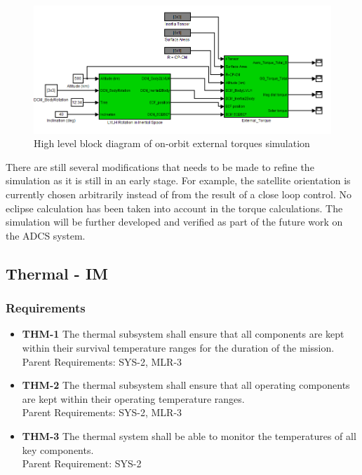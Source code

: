 \documentclass[12pt]{article}
\begin{document}
						
			\begin{figure}[!ht]
				\centering
				\includegraphics[width=\textwidth]{images/ADCS_simulink.png}
				\caption{High level block diagram of on-orbit external torques simulation}
				\label{fig:ADCS_simulink}
			\end{figure}
			
			There are still several modifications that needs to be made to refine the simulation as it is still in an early stage. For example, the satellite orientation is currently chosen arbitrarily instead of from the result of a close loop control. No eclipse calculation has been taken into account in the torque calculations. The simulation will be further developed and verified as part of the future work on the ADCS system. 
		
		
\newpage
\FloatBarrier

\subsection{Thermal - IM}
		
\subsubsection{Requirements}

\begin{itemize}
	\item \textbf{THM-1} The thermal subsystem shall ensure that all components are kept within their survival temperature ranges for the duration of the mission.
	\\
	Parent Requirements: SYS-2, MLR-3
\item \textbf{THM-2} The thermal subsystem shall ensure that all operating components are kept within their operating temperature ranges.
\\
Parent Requirements: SYS-2, MLR-3
\item \textbf{THM-3} The thermal system shall be able to monitor the temperatures of all key components.
\\
Parent Requirement: SYS-2
\end{itemize}
\end{document}
